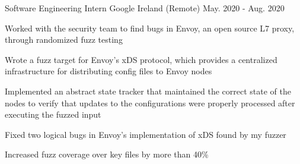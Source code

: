 \begin{cventries}
  \cventry
    {Software Engineering Intern} %
    {Google} %
    {Ireland (Remote)} %
    {May. 2020 - Aug. 2020} %
    {
      \begin{cvitems} %
        \item Worked with the security team to find bugs in Envoy, an open source L7 proxy, through randomized fuzz testing
        \item Wrote a fuzz target for Envoy's xDS protocol, which provides a centralized infrastructure for distributing config files to Envoy nodes
        \item Implemented an abstract state tracker that maintained the correct state of the nodes to verify that updates to the configurations were properly processed after executing the fuzzed input
        \item Fixed two logical bugs in Envoy's implementation of xDS found by my fuzzer
        \item Increased fuzz coverage over key files by more than 40\%
      \end{cvitems}
    }

\end{cventries}
